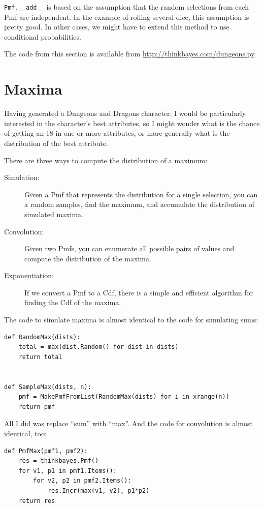 \documentclass[12pt]{book}
\begin{document}
\verb"Pmf.__add__" is based on the assumption that the random
selections from each Pmf are independent.  In the example of rolling
several dice, this assumption is pretty good.  In other cases, we
might have to extend this method to use conditional probabilities.

The code from this section is available from
\url{http://thinkbayes.com/dungeons.py}.


\section{Maxima}

Having generated a Dungeons and Dragons character, I would be
particularly interested in the character's best attributes, so
I might wonder what is the chance of getting an 18 in one or
more attributes, or more generally what is the
distribution of the best attribute.

There are three ways to compute the distribution of a maximum:

\begin{description}

\item[Simulation:] Given a Pmf that represents the distribution
for a single selection, you can a random samples, find the maximum,
and accumulate the distribution of simulated maxima.

\item[Convolution:] Given two Pmfs, you can enumerate all possible
pairs of values and compute the distribution of the maxima.

\item[Exponentiation:] If we convert a Pmf to a Cdf, there is a simple
and efficient algorithm for finding the Cdf of the maxima.

\end{description}

The code to simulate maxima is almost identical to the code for
simulating sums:

\begin{verbatim}
def RandomMax(dists):
    total = max(dist.Random() for dist in dists)
    return total


def SampleMax(dists, n):
    pmf = MakePmfFromList(RandomMax(dists) for i in xrange(n))
    return pmf
\end{verbatim}

All I did was replace ``sum'' with ``max''.  And the code
for convolution is almost identical, too:

\begin{verbatim}
def PmfMax(pmf1, pmf2):
    res = thinkbayes.Pmf()
    for v1, p1 in pmf1.Items():
        for v2, p2 in pmf2.Items():
            res.Incr(max(v1, v2), p1*p2)
    return res
\end{verbatim}
\end{document}
